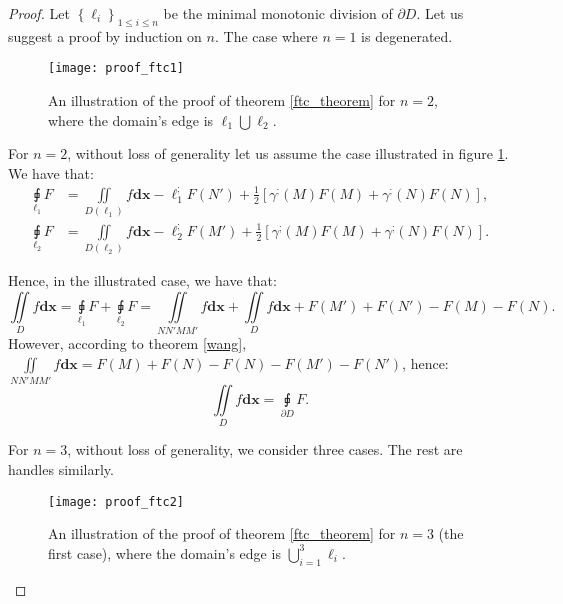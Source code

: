 \documentclass[11pt]{book}
\begin{document}
\begin{proof}Let $\left\{ \ell_{i}\right\} _{1\leq i\leq n}$ be the minimal
monotonic division of $\partial D$. Let us suggest a proof by induction
on $n$. The case where $n=1$ is degenerated.

\begin{figure}
\texttt{[image: proof\_ftc1]}
\caption{An illustration of the proof of theorem \ref{ftc_theorem} for $n=2$, where the domain’s edge is $\ell_{1}\bigcup\ell_{2}$.}
\label{ftc_proof1_fig}
\end{figure}

For $n=2$, without loss of generality let us assume the case illustrated
in figure \ref{ftc_proof1_fig}. We have that:
\begin{align*}
\underset{\ell_{1}}{\sqint}F & =\underset{D\left(\ell_{1}\right)}{\iint}f\boldsymbol{dx}-\ell_{1}^{;}F\left(N'\right)+\frac{1}{2}\left[\gamma^{;}\left(M\right)F\left(M\right)+\gamma^{;}\left(N\right)F\left(N\right)\right],\\
\underset{\ell_{2}}{\sqint}F & =\underset{D\left(\ell_{2}\right)}{\iint}f\boldsymbol{dx}-\ell_{2}^{;}F\left(M'\right)+\frac{1}{2}\left[\gamma^{;}\left(M\right)F\left(M\right)+\gamma^{;}\left(N\right)F\left(N\right)\right].
\end{align*}

Hence, in the illustrated case, we have that:
\[
\underset{D}{\iint}f\boldsymbol{dx}=\underset{\ell_{1}}{\sqint}F+\underset{\ell_{2}}{\sqint}F=\underset{NN'MM'}{\iint}f\boldsymbol{dx}+\underset{D}{\iint}f\boldsymbol{dx}+F\left(M'\right)+F\left(N'\right)-F\left(M\right)-F\left(N\right).
\]
However, according to theorem \ref{wang}, $\underset{NN'MM'}{\iint}f\boldsymbol{dx}=F\left(M\right)+F\left(N\right)-F\left(N\right)-F\left(M'\right)-F\left(N'\right)$,
hence:
\[
\underset{D}{\iint}f\boldsymbol{dx}=\underset{\partial D}{\sqint}F.
\]

For $n=3$, without loss of generality, we consider three cases. The
rest are handles similarly.

\begin{figure}
\texttt{[image: proof\_ftc2]}
\caption{An illustration of the proof of theorem \ref{ftc_theorem} for $n=3$ (the first case), where the domain’s edge is $\bigcup_{i=1}^{3}\ell_{i}$.}
\label{ftc_proof2_fig}
\end{figure}


\end{proof}
\end{document}
